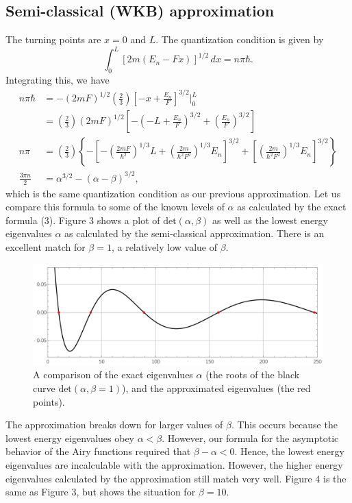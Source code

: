 \documentclass[12pt]{article}
\begin{document}
\subsection*{Semi-classical (WKB) approximation}
The turning points are $x = 0$ and $L$.  The quantization condition is given by
\[
	\int_{0}^{L} \left[ 2m(E_n - Fx) \right]^{1/2} \,\textit{d}x = n \pi \hbar.
\] 
Integrating this, we have
\begin{align*}
	n\pi \hbar &= -(2mF)^{1/2} \left( \frac{2}{3} \right) \left[ -x + \frac{E_n}{F} \right]^{3/2}\Bigg|_{0}^{L} \\
		   &= \left( \frac{2}{3} \right)(2mF)^{1/2} \left[ -\left( -L + \frac{E_n}{F} \right)^{3/2} + \left( \frac{E_n}{F} \right)^{3/2} \right] \\
	n \pi &= \left( \frac{2}{3} \right)\left\{ -\left[ -\left( \frac{2mF}{\hbar^2} \right)^{1/3}L + \left( \frac{2m}{\hbar^2 F^2} \right)^{1/3}E_n \right]^{3/2} + \left[ \left( \frac{2m}{\hbar^2 F^2} \right)^{1/3} E_n \right]^{3/2} \right\} \\
	       \frac{3\pi n}{2} &= 	\alpha^{3/2} - (\alpha - \beta)^{3/2}  ,
\end{align*}
which is the same quantization condition as our previous approximation.  Let us compare this formula to some of the known levels of $\alpha$ as calculated by the exact formula (3).  Figure 3 shows a plot of $\text{det}(\alpha, \beta)$ as well as the lowest energy eigenvalues $\alpha$ as calculated by the semi-classical approximation.  There is an excellent match for $\beta = 1$, a relatively low value of $\beta$.  

\begin{figure}[ht]
	\centering
	\includegraphics[width=\textwidth]{figures/plot3.png}
	\caption{A comparison of the exact eigenvalues $\alpha$ (the roots of the black curve $\text{det}(\alpha,\beta=1) $), and the approximated eigenvalues (the red points).}
\end{figure}

The approximation breaks down for larger values of $\beta$.  This occurs because the lowest energy eigenvalues obey $\alpha < \beta$.  However, our formula for the asymptotic behavior of the Airy functions required that $\beta - \alpha < 0$.  Hence, the lowest energy eigenvalues are incalculable with the approximation.  However, the higher energy eigenvalues calculated by the approximation still match very well.  Figure 4 is the same as Figure 3, but shows the situation for $\beta = 10$.   
\end{document}
